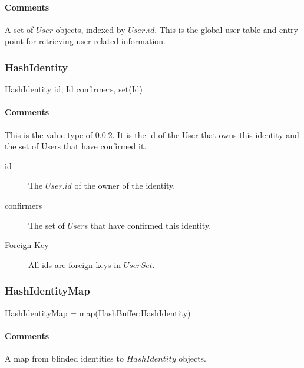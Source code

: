 \documentclass[a4paper,10pt]{article}
\begin{document}
\paragraph*{Comments}
A set of $User$ objects, indexed by $User.id$. This is the global user table and entry point for retrieving user related information.

\subsubsection{HashIdentity}

\begin{verbbox}
HashIdentity
{
  id, Id
  confirmers, set(Id)
}
\end{verbbox}
\begin{center}
\theverbbox
\end{center}

\begin{inparaitem}[ ]
 \item \infrastructure
\end{inparaitem}

\paragraph*{Comments}
This is the value type of \ref{sec:structure:server:hash_identity_map}. It is the id of the User that owns this identity and the set of Users that have confirmed it.

\SpecialItem
\begin{description}
 \item[id] The $User.id$ of the owner of the identity.
 \item[confirmers] The set of $User$s that have confirmed this identity.
\end{description}

\SpecialItem
\begin{description}
 \item[Foreign Key] All ids are foreign keys in $UserSet$.
\end{description}

\subsubsection{HashIdentityMap}
\label{sec:structure:server:hash_identity_map}
\begin{verbbox}
HashIdentityMap = map(HashBuffer:HashIdentity)
\end{verbbox}
\begin{center}
\theverbbox
\end{center}

\begin{inparaitem}[ ]
 \item \secure
 \item \persistent
 \item \unique
\end{inparaitem}

\paragraph*{Comments}
A map from blinded identities to $HashIdentity$ objects.



\end{document}
